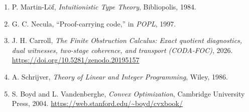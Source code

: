 \documentclass[
  11pt,
]{article}
\providecommand{\tightlist}{%
  \setlength{\itemsep}{0pt}\setlength{\parskip}{0pt}}
\begin{document}
\begin{enumerate}
\def\labelenumi{\arabic{enumi}.}
\tightlist
\item
  P. Martin-Löf, \emph{Intuitionistic Type Theory}, Bibliopolis, 1984.
\item
  G. C. Necula, ``Proof-carrying code,'' in \emph{POPL}, 1997.
\item
  J. H. Carroll, \emph{The Finite Obstruction Calculus: Exact quotient diagnostics, dual witnesses, two-stage coherence, and transport (CODA-FOC)}, 2026. \url{https://doi.org/10.5281/zenodo.20195157}
\item
  A. Schrijver, \emph{Theory of Linear and Integer Programming}, Wiley, 1986.
\item
  S. Boyd and L. Vandenberghe, \emph{Convex Optimization}, Cambridge University Press, 2004. \url{https://web.stanford.edu/~boyd/cvxbook/}
\end{enumerate}
\end{document}
